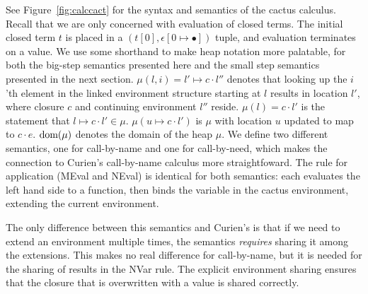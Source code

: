 See Figure~\ref{fig:calccact} for the syntax and semantics of the cactus
calculus. Recall that we are only concerned with evaluation of closed terms. The
initial closed term $t$ is placed in a $(t[0],\epsilon[0 \mapsto \bullet])$
tuple, and evaluation terminates on a value. We use some shorthand to make heap
notation more palatable, for both the big-step semantics presented here and the
small step semantics presented in the next section. $\mu(l,i)=l' \mapsto c
\cdot l''$ denotes that looking up the $i$'th element in the linked environment
structure starting at $l$ results in location $l'$, where closure $c$ and
continuing environment $l''$ reside. $\mu(l) = c \cdot l'$ is the statement
that $l \mapsto c \cdot l' \in \mu$. $\mu(u \mapsto c \cdot l')$ is $\mu$ with
location $u$ updated to map to $c \cdot e$. $\textnormal{dom}(\mu)$ denotes the
domain of the heap $\mu$. We define two different semantics, one for call-by-name and
one for call-by-need, which makes the connection to Curien's call-by-name
calculus more straightfoward. The rule for application (MEval and NEval) is
identical for both semantics: each evaluates the left hand side to a function,
then binds the variable in the cactus environment, extending the current
environment.

The only difference between this semantics and Curien's is that if we need
to extend an environment multiple times, the semantics \emph{requires}
sharing it among the extensions. This makes no real difference for call-by-name,
but it is needed for the sharing of results in the NVar rule. The explicit
environment sharing ensures that the closure that is overwritten with a value is
shared correctly.

